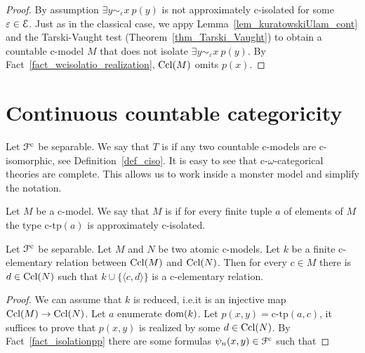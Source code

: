 \documentclass{amsproc}
\renewcommand*{\emph}[1]{%
   \smash{\tikz[baseline]\node[rectangle, fill=teal!25, rounded corners, inner xsep=0.5ex, inner ysep=0.2ex, anchor=base, minimum height = 2.7ex]{\strut #1};}}
\begin{document}
{\begin{proof}
  By assumption $\exists y\sim_\varepsilon x\ p(y)$ is not approximately c-isolated for some $\varepsilon\in{\EuScript E}$. 
  Just as in the classical case, we appy Lemma~\ref{lem_kuratowskiUlam_cont} and the Tarski-Vaught test (Theorem~\ref{thm_Tarski_Vaught}) to obtain a countable c-model $M$ that does not isolate $\exists y\sim_\varepsilon x\ p(y)$.
  By Fact~\ref{fact_wcisolatio_realization}, ${\rm Ccl}(M)$ omits $p(x)$. 
\end{proof}

\section{Continuous countable categoricity}

\def\ceq#1#2#3{\parbox[t]{25ex}{$\displaystyle #1$}\parbox[t]{6ex}{$\displaystyle\hfil #2$}{$\displaystyle #3$}}

Let ${\EuScript F}^{\rm c}$ be separable.
We say that $T$ is \emph{c-$\omega$-categorical\/} if any two countable c-models are c-isomorphic, see Definition~\ref{def_ciso}.
It is easy to see that c-$\omega$-categorical theories are complete.
This allows us to work inside a monster model and simplify the notation.

Let $M$ be a c-model.
We say that $M$ is \emph{atomic\/} if for every finite tuple $a$ of elements of $M$ the type $\mbox{c-tp}(a)$ is approximately c-isolated.

\begin{lemma}\label{lem_atomic_iso}
  Let ${\EuScript F}^{\rm c}$ be separable.
  Let $M$ and $N$ be two atomic c-models.
  Let $k$ be a finite c-elementary relation between ${\rm Ccl}(M)$ and ${\rm Ccl}(N)$.
  Then for every $c\in M$ there is $d\in{\rm Ccl}(N)$ such that $k\cup\{\langle c,d\rangle\}$ is a c-elementary relation.
\end{lemma}

\begin{proof}
  We can assume that $k$ is reduced, i.e.\@ it is an injective map ${\rm Ccl}(M)\rightarrow{\rm Ccl}(N)$.
  Let $a$ enumerate ${\rm dom}(k)$.
  Let $p(x,y)=\mbox{c-tp}(a,c)$, it suffices to prove that $p(x,y)$ is realized by some $d\in{\rm Ccl}(N)$.
  By Fact~\ref{fact_isolationpp} there are some formulas $\psi_n(x,y)\in{\EuScript F}^{\rm c}$ such that
  

\end{proof}}
\end{document}
